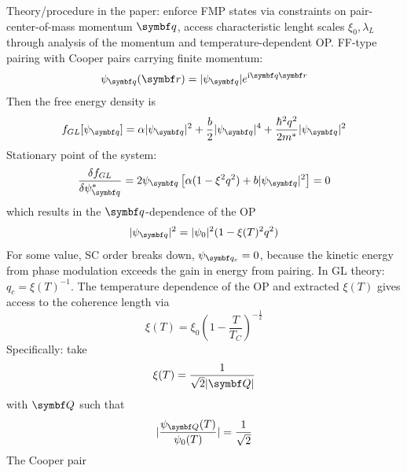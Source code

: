 \documentclass[../notes.tex]{subfiles}
\begin{document}
Theory/procedure in the paper: enforce FMP states via constraints on pair-center-of-mass momentum \(\vb{q}\), access characteristic lenght scales \(\xi_0, \lambda_L\) through analysis of the momentum and temperature-dependent OP\@.
FF-type pairing with Cooper pairs carrying finite momentum:
\begin{equation}
	\psi_{\vb{q}} (\vb{r}) = \vert \psi_{\vb{q}} \vert e^{\iu \vb{q} \vb{r}}
\end{equation}
Then the free energy density is
\begin{equation}
	f_{GL} [\psi_{\vb{q}}] = \alpha \vert \psi_{\vb{q}} \vert^2 + \frac{b}{2} \vert \psi_{\vb{q}} \vert^4 + \frac{\hbar^2 q^2}{2 m^*} \vert \psi_{\vb{q}} \vert^2
\end{equation}
Stationary point of the system:
\begin{equation}
	\fdv{f_{GL}}{\psi_{\vb{q}}^*} = 2 \psi_{\vb{q}} \left[\alpha (1 - \xi^2 q^2) + b \vert \psi_{\vb{q}} \vert^2\right] = 0
\end{equation}
which results in the \(\vb{q}\)-dependence of the OP
\begin{equation}
	\vert \psi_{\vb{q}} \vert^2 = \vert \psi_{0} \vert^2 (1 - \xi(T)^2 q^2)
\end{equation}
For some value, SC order breaks down, \(\psi_{\vb{q}_c} = 0\), because the kinetic energy from phase modulation exceeds the gain in energy from pairing.
In GL theory: \(q_c = \xi(T)^{-1}\).
The temperature dependence of the OP and extracted \(\xi(T)\) gives access to the coherence length via
\begin{equation}
	\xi(T) = \xi_0 (1 - \frac{T}{T_C})^{-\frac{1}{2}}
\end{equation}
Specifically: take
\begin{equation}
	\xi(T) = \frac{1}{\sqrt{2} \vert \vb{Q} \vert}
\end{equation}
with \(\vb{Q}\) such that
\begin{equation}
	\vert \frac{\psi_{\vb{Q}}(T)}{\psi_0 (T)} \vert = \frac{1}{\sqrt{2}}
\end{equation}
The Cooper pair \cite{yuanSupercurrentDiodeEffect2022, shimanoHiggsModeSuperconductors2020}




\end{document}
